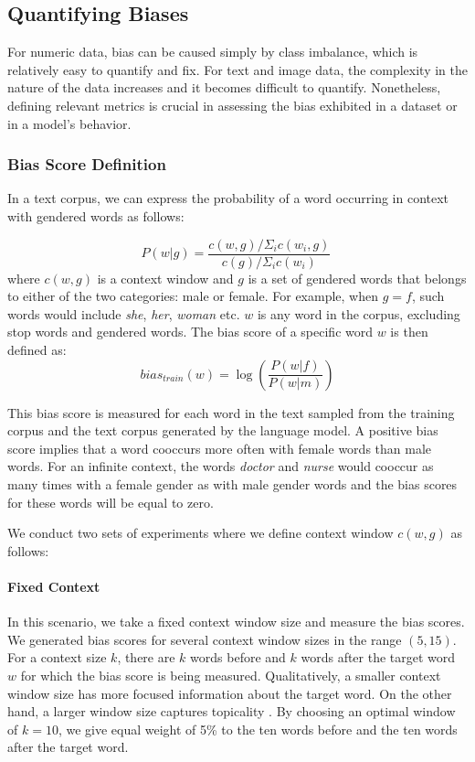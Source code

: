 \documentclass[11pt,a4paper]{article}
\begin{document}
\subsection{Quantifying Biases} 
\label{bias}

 For numeric data,  bias can be caused simply by class imbalance, which is relatively easy to quantify and fix. For text and image data, the complexity in the nature of the data increases and it becomes difficult to quantify. Nonetheless, defining relevant metrics is crucial in assessing the bias exhibited in a dataset or in a model's behavior.

\subsubsection {Bias Score Definition}


In a text corpus, we can express the probability of a word occurring in context with gendered words as follows:

$$P(w|g)  =  \frac{{c(w,g)/ \Sigma_{i} c(w_i, g)}}{{c(g)}/\Sigma_{i} c(w_i)}\
$$ 
where $c(w,g)$ is a context window and $g$ is a set of gendered words that belongs to either of the two categories: male or female. For example, when $g = f$,  such words would include \textit{she}, \textit{her}, \textit{woman} etc. $w$ is any  word in the corpus, excluding stop words and gendered words. 
The bias score of a specific word $w$ is then defined as:
$$
bias_{train}(w) = \log\left({\frac{P(w|f)}{P(w|m)}}\right)
$$

This bias score is measured for each word in the text sampled from the training corpus and the text corpus generated by the language model. A positive bias score implies that a word cooccurs more often with female words than male words. For an infinite context, the words \textit{doctor} and \textit{nurse} would cooccur as many times with a female gender as with male gender words and the bias scores for these words will be equal to zero.



We conduct two sets of experiments where we define context window  $c(w,g)$ as follows:
\paragraph{Fixed Context} In this scenario, we take a fixed context window size and measure the bias scores. We generated bias scores for several context window sizes in the range $(5,15)$. For a context size $\textit{k}$, there are $\textit{k}$ words before and $\textit{k}$ words after the target word $w$ for which the bias score is being measured. Qualitatively, a smaller context window size has more focused information about the target word. On the other hand, a larger window size captures topicality \cite{levy2014dependency}. By choosing an optimal window of $\textit{k}=10$, we give equal weight of 5\% to the ten words before and the ten words after the target word.
\end{document}
